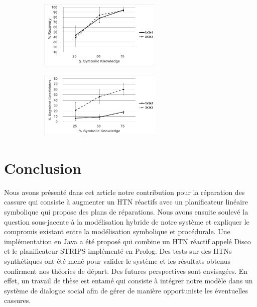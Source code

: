 \documentclass[a4paper,twoside,french]{article}
\begin{document}
		\begin{figure}[t]
			\centering
			\begin{subfigure}{2.3in}
				\centerline{\includegraphics[width=2.3in]{figs/recovery}}
				\vskip 8pt 
			\end{subfigure}
			\hfill
			\begin{subfigure}{2.3in}
				\centerline{\includegraphics[width=2.3in]{figs/candidates}}
				\vskip 8pt 
			\end{subfigure}
			\vskip 6pt
		\end{figure}
\section{Conclusion}
 Nous avons présenté dans cet article notre contribution pour la réparation des cassure qui consiste à augmenter un HTN réactifs avec un planificateur linéaire symbolique qui propose des plans de réparations. Nous avons ensuite soulevé la question sous-jacente à la modélisation hybride de notre système et expliquer le compromis existant entre la modélisation symbolique et procédurale. Une implémentation en Java a été proposé qui combine un HTN réactif appelé Disco et le planificateur STRIPS implémenté en Prolog. Des tests sur des HTNs synthétiques ont été mené pour valider le système et les résultats obtenus confirment nos théories de départ.  Des futures perspectives sont envisagées. En effet, un travail de thèse est entamé qui consiste à intégrer notre modèle dans un système de dialogue social afin de gérer de manière opportuniste les éventuelles cassures.  
		\vskip 4pt
		
							
				
\end{document}
